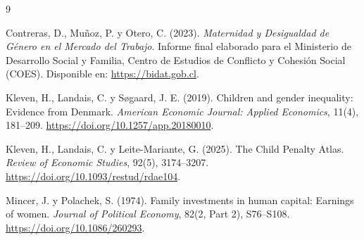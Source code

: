 \documentclass[11pt,a4paper]{article}
\begin{document}
\vspace{0.5cm}

\begin{thebibliography}{9}

Contreras, D., Muñoz, P. y Otero, C. (2023). 
\textit{Maternidad y Desigualdad de Género en el Mercado del Trabajo}. 
Informe final elaborado para el Ministerio de Desarrollo Social y Familia, Centro de Estudios de Conflicto y Cohesión Social (COES). Disponible en: \url{https://bidat.gob.cl}.

Kleven, H., Landais, C. y Søgaard, J. E. (2019). 
Children and gender inequality: Evidence from Denmark. 
\textit{American Economic Journal: Applied Economics}, 11(4), 181--209. \url{https://doi.org/10.1257/app.20180010}.

Kleven, H., Landais, C. y Leite-Mariante, G. (2025). 
The Child Penalty Atlas. 
\textit{Review of Economic Studies}, 92(5), 3174--3207. \url{https://doi.org/10.1093/restud/rdae104}.

Mincer, J. y Polachek, S. (1974). 
Family investments in human capital: Earnings of women. 
\textit{Journal of Political Economy}, 82(2, Part 2), S76--S108. \url{https://doi.org/10.1086/260293}.

\end{thebibliography}
\end{document}
